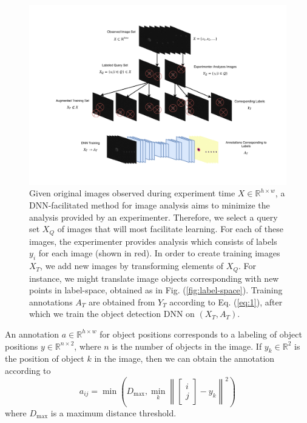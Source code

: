 \documentclass[10pt, journal]{IEEEtran}
\newcommand{\norm}[1]{\left\lVert#1\right\rVert}
\begin{document}
\begin{figure}
  \centering
  \includegraphics[width=\linewidth]{training}
  \caption{Given original images observed during experiment time
    $X \in \mathbb{R}^{h\times w}$, a DNN-facilitated method for image analysis
    aims to minimize the analysis provided by an experimenter. Therefore, we
    select a query set $X_Q$ of images that will most facilitate learning. For
    each of these images, the experimenter provides analysis which consists of
    labels $y_i$ for each image (shown in red). In order to create training
    images $X_T$, we add new images by transforming elements of $X_Q$. For
    instance, we might translate image objects corresponding with new points in
    label-space, obtained as in Fig. (\ref{fig:label-space}). Training
    annotations $A_T$ are obtained from $Y_T$ according to Eq. (\ref{eq:1}),
    after which we train the object detection DNN on $(X_T, A_T)$.}
  \label{fig:training}
\end{figure}

An annotation $a \in \mathbb{R}^{h\times w}$ for object positions corresponds to
a labeling of object positions $y \in \mathbb{R}^{n\times 2}$, where $n$ is the
number of objects in the image. If $y_k \in \mathbb{R}^2$ is the position of
object $k$ in the image, then we can obtain the annotation according to
\begin{equation}
  \label{eq:1}
  a_{ij} = \min\left(D_{\max},
    \min_k \norm{
      \begin{bmatrix}
        i \\
        j
      \end{bmatrix} - y_k}^2
  \right)
\end{equation}
where $D_{\max}$ is a maximum distance threshold.
 
\end{document}
